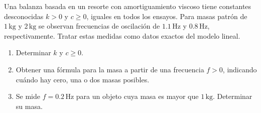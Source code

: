 Una balanza basada en un resorte con amortiguamiento viscoso tiene constantes desconocidas \(k>0\) y \(c\ge0\), iguales en todos los ensayos. Para masas patrón de \(1\,\mathrm{kg}\) y \(2\,\mathrm{kg}\) se observan frecuencias de oscilación de \(1.1\,\mathrm{Hz}\) y \(0.8\,\mathrm{Hz}\), respectivamente. Tratar estas medidas como datos exactos del modelo lineal.

\begin{enumerate}[label=(\alph*),ref=\alph*,leftmargin=*]
\item Determinar \(k\) y \(c\ge0\).
\item Obtener una fórmula para la masa a partir de una frecuencia \(f>0\), indicando cuándo hay cero, una o dos masas posibles.
\item Se mide \(f=0.2\,\mathrm{Hz}\) para un objeto cuya masa es mayor que \(1\,\mathrm{kg}\). Determinar su masa.
\end{enumerate}
